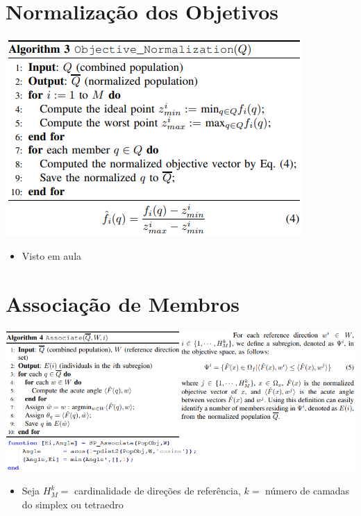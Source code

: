\documentclass{rbfin}
\begin{document}
\newpage
\section{Normalização dos Objetivos}

\vspace{6mm}

\begin{center}
\includegraphics[scale=1.4]{alg3}
\end{center}

\begin{itemize}
  \item Visto em aula
\end{itemize}

\newpage
\section{Associação de Membros}

\vspace{6mm}

\begin{center}
\includegraphics[scale=1.35]{alg4}
\end{center}

\begin{itemize}
  \item Seja $H^k_M=$ cardinalidade de direções de referência, $k=$ número de camadas do simplex ou tetraedro
\end{itemize}
\end{document}

